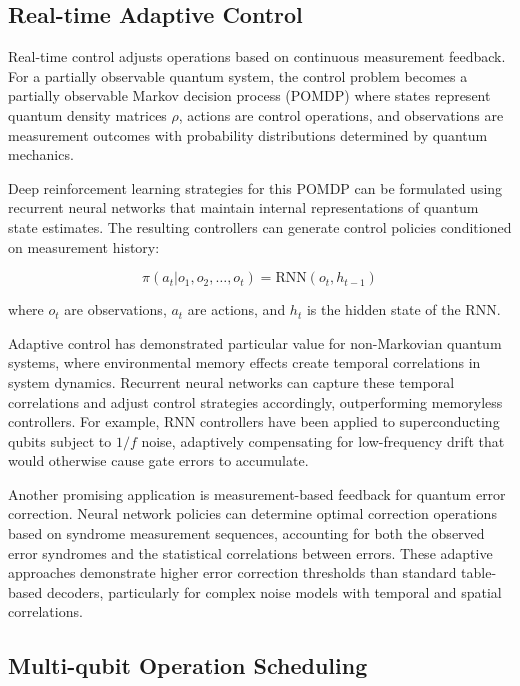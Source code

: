 \subsection{Real-time Adaptive Control}

Real-time control adjusts operations based on continuous measurement feedback. For a partially observable quantum system, the control problem becomes a partially observable Markov decision process (POMDP) where states represent quantum density matrices $\rho$, actions are control operations, and observations are measurement outcomes with probability distributions determined by quantum mechanics.

Deep reinforcement learning strategies for this POMDP can be formulated using recurrent neural networks that maintain internal representations of quantum state estimates. The resulting controllers can generate control policies conditioned on measurement history:

\begin{equation}
\pi(a_t | o_1, o_2, \ldots, o_t) = \text{RNN}(o_t, h_{t-1})
\end{equation}

where $o_t$ are observations, $a_t$ are actions, and $h_t$ is the hidden state of the RNN.

Adaptive control has demonstrated particular value for non-Markovian quantum systems, where environmental memory effects create temporal correlations in system dynamics. Recurrent neural networks can capture these temporal correlations and adjust control strategies accordingly, outperforming memoryless controllers. For example, RNN controllers have been applied to superconducting qubits subject to $1/f$ noise, adaptively compensating for low-frequency drift that would otherwise cause gate errors to accumulate.

Another promising application is measurement-based feedback for quantum error correction. Neural network policies can determine optimal correction operations based on syndrome measurement sequences, accounting for both the observed error syndromes and the statistical correlations between errors. These adaptive approaches demonstrate higher error correction thresholds than standard table-based decoders, particularly for complex noise models with temporal and spatial correlations.

\subsection{Multi-qubit Operation Scheduling}

